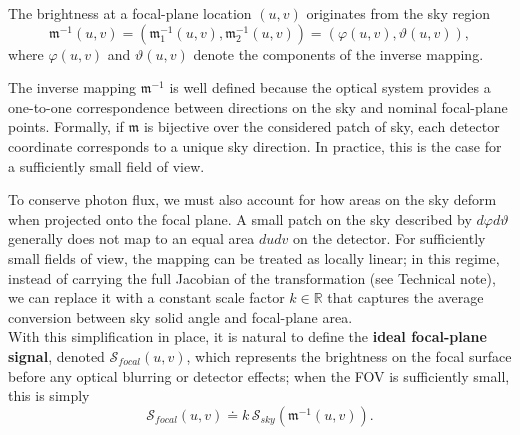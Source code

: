 The brightness at a focal-plane location $(u,v)$ originates from the sky region
\[
    \boldsymbol{\mathfrak{m}}^{-1}(u,v)=\left(\mathfrak{m}_1^{-1}(u,v),\mathfrak{m}_2^{-1}(u,v)\right)=\left(\varphi(u,v),\vartheta(u,v)\right),
\]
where $\varphi(u,v)$ and $\vartheta(u,v)$ denote the components of the inverse mapping.
\begin{tcolorbox}[colback=blue!5!white, colframe=blue!50!black, title=Technical note]
    The inverse mapping $\boldsymbol{\mathfrak{m}}^{-1}$ is well defined because the optical system provides a one-to-one correspondence between directions on the sky and nominal focal-plane points.
    Formally, if $\boldsymbol{\mathfrak{m}}$ is bijective over the considered patch of sky, each detector coordinate corresponds to a unique sky direction.
    In practice, this is the case for a sufficiently small field of view.
\end{tcolorbox}\vspace{2mm}\noindent
To conserve photon flux, we must also account for how areas on the sky deform when projected onto the focal plane.
A small patch on the sky described by $d\varphi d\vartheta$ generally does not map to an equal area $dudv$ on the detector.
For sufficiently small fields of view, the mapping can be treated as locally linear; in this regime, instead of carrying the full Jacobian of the transformation (see Technical note), we can replace it with a constant scale factor $k\in\mathbb{R}$ that captures the average conversion between sky solid angle and focal-plane area.
\\[\baselineskip]
With this simplification in place, it is natural to define the \textbf{ideal focal-plane signal}, denoted $\mathcal{S}_{focal}(u,v)$, which represents the brightness on the focal surface before any optical blurring or detector effects; when the FOV is sufficiently small, this is simply
\begin{equation} \label{focal signal definition}
    \mathcal{S}_{focal}(u,v)\doteq k\,\mathcal{S}_{sky}\left(\boldsymbol{\mathfrak{m}}^{-1}(u,v)\right).
\end{equation}
